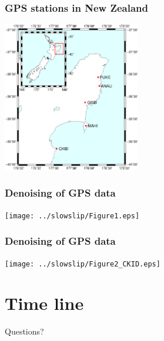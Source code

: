 \documentclass{beamer}
\begin{document}
	\begin{frame}
		\frametitle{GPS stations in New Zealand}
		\begin{center}
			\includegraphics[trim={1cm 3cm 2cm 6cm}, clip, width=6cm]{Hikurangi/studyarea.eps}
		\end{center}
	\end{frame}

	\begin{frame}
		\frametitle{Denoising of GPS data}
		\begin{center}
			\texttt{[image: ../slowslip/Figure1.eps]}
		\end{center}
	\end{frame}

	\begin{frame}
		\frametitle{Denoising of GPS data}
		\begin{center}
			\texttt{[image: ../slowslip/Figure2\_CKID.eps]}
		\end{center}
	\end{frame}


	\section{Time line}

	\begin{frame}
		\begin{Huge}
			\begin{center}
				Questions?
			\end{center}
		\end{Huge}
	\end{frame}
			
\end{document}
